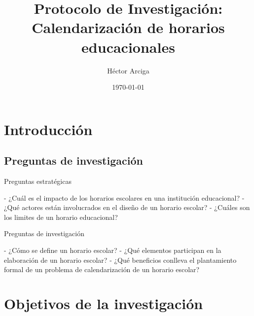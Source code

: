 \documentclass[draft,12pt,headsepline,footsepline,paper=letter]{scrreprt}
\begin{document}
\title{Protocolo de Investigación: Calendarización de horarios educacionales}
\author{Héctor Arciga}
\date{\today}

\maketitle

\begin{spacing}{1}
\tableofcontents
\glsaddall 
\printglossaries
\listoffigures
\listoftables
\end{spacing}


\chapter{Introducción}


\section{Preguntas de investigaci\'on}

Preguntas estrat\'egicas

- ¿Cuál es el impacto de los horarios escolares en una institución educacional?
- ¿Qué actores están involucrados en el diseño de un horario escolar?
- ¿Cuáles son los limites de un horario educacional?

Preguntas de investigación

- ¿Cómo se define un horario escolar?
- ¿Qué elementos participan en la elaboración de un horario escolar?
- ¿Qué beneficios conlleva el plantamiento formal de un problema de calendarización de un horario escolar?

\chapter{Objetivos de la investigación}
\end{document}
